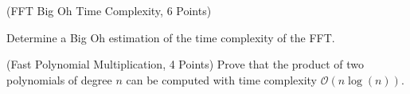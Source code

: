 \documentclass[11pt]{article}
\begin{document}
\begin{exercise}(FFT Big Oh Time Complexity, 6 Points)

Determine a Big Oh estimation of the time complexity of the FFT.


\begin{exercise}(Fast Polynomial Multiplication, 4 Points)
Prove that the product of two polynomials of degree $n$ can be computed with time complexity $\mathcal{O}(n\log(n))$.
\end{exercise}


\end{exercise}
\end{document}
